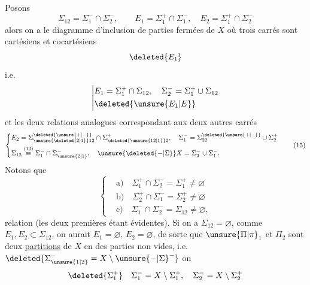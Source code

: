 \begingroup
\makeatletter\tagsleft@true\makeatother
Posons
\[
\Sigma_{12}=\Sigma_1^-\cap\Sigma_2^-,\qquad E_1=\Sigma_1^+\cap\Sigma_1^-,\quad E_2=\Sigma_1^+\cap\Sigma_2^-\tag*{(13)}
\]
alors on a le diagramme d'inclusion de parties fermées de $X$
\usetikzlibrary{decorations.pathmorphing}
où  trois carrés sont cartésiens et cocartésiens
\[
\deleted{E_1}
\]
i.e.
\[
\left|\begin{aligned}
&E_1=\Sigma_1^+\cap\Sigma_{12},\quad\Sigma_2^-=\Sigma_1^+\cup\Sigma_{12}\\
&\deleted{\unsure{E_1|E}}
\end{aligned}\right.
\]
et les deux relations analogues correspondant aux deux autres carrés
\[
\left\{\begin{aligned}
&E_2=\Sigma_{\unsure{\deleted{2|1}}12}^{\deleted{\unsure{+|-}}}\cap\Sigma_{\deleted{\unsure{12|1}}2}^+,\quad \Sigma_1^-=\Sigma_{22}^{\deleted{\unsure{+|-}}}\cup\Sigma_2^+\\
&\Sigma_{12}\overset{(13)}{\equiv}\Sigma_1^-\cap\Sigma_{\unsure{2|1}}^-,\quad \unsure{\deleted{{-}|\Sigma}}X=\Sigma_2^-\cup\Sigma_1^-.
\end{aligned}\right.\tag*{(15)}
\]
Notons que
\[
\left\{\begin{aligned}
&\text{a)}\quad\Sigma_1^+\cap\Sigma_2^-=\Sigma_1^+\ne\varnothing\\
&\text{b)}\quad\Sigma_2^+\cap\Sigma_1^-=\Sigma_2^+\ne\varnothing\\
&\text{c)}\quad\Sigma_1^-\cap\Sigma_2^-=\Sigma_{12}\ne\varnothing,
\end{aligned}\right.\tag*{(16)}
\]
   relation (les deux premières étant évidentes).
Si on a $\Sigma_{12}=\varnothing$, comme $E_1,E_2\subset\Sigma_{12}$, on aurait $E_1=\varnothing$, $E_2=\varnothing$, de sorte que $\unsure{\Pi|\pi}_1$ et $\Pi_2$ sont deux \uline{partitions} de $X$ en des parties non vides, i.e. $\deleted{\Sigma_{\unsure{1|2}}^- = X\setminus{\unsure{{-}|\Sigma}}^-}$ on 
\[
\deleted{\Sigma_1^+}\quad\Sigma_1^-=X\setminus\Sigma_1^+,\quad\Sigma_2^-=X\setminus\Sigma_2^+
\]
\endgroup

